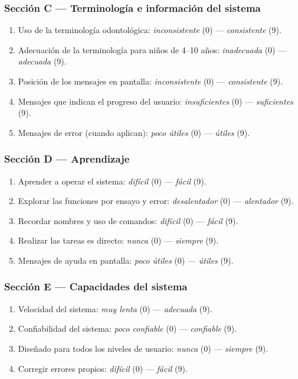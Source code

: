 \documentclass[12pt, a4paper]{article}
\begin{document}
\subsubsection{Sección C — Terminología e información del sistema}

\begin{enumerate}[leftmargin=1.5cm, itemsep=4pt]
  \item Uso de la terminología odontológica: \textit{inconsistente} (0) — \textit{consistente} (9).
  \item Adecuación de la terminología para niños de 4--10 años:
        \textit{inadecuada} (0) — \textit{adecuada} (9).
  \item Posición de los mensajes en pantalla: \textit{inconsistente} (0) — \textit{consistente} (9).
  \item Mensajes que indican el progreso del usuario: \textit{insuficientes} (0) — \textit{suficientes} (9).
  \item Mensajes de error (cuando aplican): \textit{poco útiles} (0) — \textit{útiles} (9).
\end{enumerate}

\subsubsection{Sección D — Aprendizaje}

\begin{enumerate}[leftmargin=1.5cm, itemsep=4pt]
  \item Aprender a operar el sistema: \textit{difícil} (0) — \textit{fácil} (9).
  \item Explorar las funciones por ensayo y error: \textit{desalentador} (0) — \textit{alentador} (9).
  \item Recordar nombres y uso de comandos: \textit{difícil} (0) — \textit{fácil} (9).
  \item Realizar las tareas es directo: \textit{nunca} (0) — \textit{siempre} (9).
  \item Mensajes de ayuda en pantalla: \textit{poco útiles} (0) — \textit{útiles} (9).
\end{enumerate}

\subsubsection{Sección E — Capacidades del sistema}

\begin{enumerate}[leftmargin=1.5cm, itemsep=4pt]
  \item Velocidad del sistema: \textit{muy lenta} (0) — \textit{adecuada} (9).
  \item Confiabilidad del sistema: \textit{poco confiable} (0) — \textit{confiable} (9).
  \item Diseñado para todos los niveles de usuario: \textit{nunca} (0) — \textit{siempre} (9).
  \item Corregir errores propios: \textit{difícil} (0) — \textit{fácil} (9).
\end{enumerate}
\end{document}
